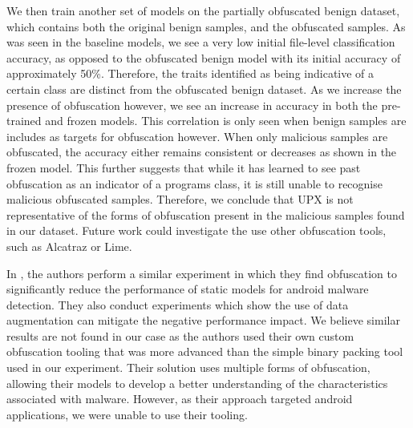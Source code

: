 \documentclass[conference,compsoc]{IEEEtran}
\begin{document}
We then train another set of models on the partially obfuscated benign dataset, which contains both the original benign samples, and the obfuscated samples. As was seen in the baseline models, we see a very low initial file-level classification accuracy, as opposed to the obfuscated benign model with its initial accuracy of approximately 50\%. Therefore, the traits identified as being indicative of a certain class are distinct from the obfuscated benign dataset. As we increase the presence of obfuscation however, we see an increase in accuracy in both the pre-trained and frozen models. This correlation is only seen when benign samples are includes as targets for obfuscation however. When only malicious samples are obfuscated, the accuracy either remains consistent or decreases as shown in the frozen model. This further suggests that while it has learned to see past obfuscation as an indicator of a programs class, it is still unable to recognise malicious obfuscated samples. Therefore, we conclude that UPX is not representative of the forms of obfuscation present in the malicious samples found in our dataset. Future work could investigate the use other obfuscation tools, such as Alcatraz or Lime.

In \cite{bacciImpactCodeObfuscation2018}, the authors perform a similar experiment in which they find obfuscation to significantly reduce the performance of static models for android malware detection. They also conduct experiments which show the use of data augmentation can mitigate the negative performance impact. We believe similar results are not found in our case as the authors used their own custom obfuscation tooling that was more advanced than the simple binary packing tool used in our experiment. Their solution uses multiple forms of obfuscation, allowing their models to develop a better understanding of the characteristics associated with malware. However, as their approach targeted android applications, we were unable to use their tooling. 
\end{document}
